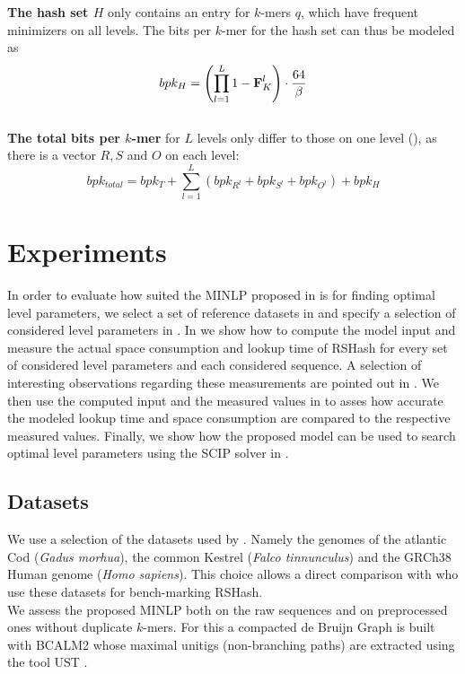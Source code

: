 \documentclass[a4paper,titlepage,onecolumn,oneside,12pt,nenglish,titlepage=firstiscover]{scrbook}
\theoremstyle{plain} %
\theoremstyle{definition} %
\theoremstyle{remark} %
\theoremstyle{plain}
\newcommand{\level}{l}
\newcommand{\kmer}{q}
\begin{document}
\textbf{The hash set $H$} only contains an entry for $k$-mers $\kmer$, which have frequent minimizers on all levels.
The bits per $k$-mer for the hash set can thus be modeled as 
\[ bpk_H = \left(\prod_{l=1}^{L} 1-\varCDF{K}^\level\right) \cdot \frac{64}{\beta}\]\\

\textbf{The total bits per $k$-mer} for $L$ levels only differ to those on one level (), as there is a vector $R,S$ and $O$ on each level:
\[ bpk_{total} = bpk_T + \sum_{l=1}^{L} \left(bpk_{R^\level} + bpk_{S^\level} + bpk_{O^\level}\right) + bpk_H\]

\chapter{Experiments}\label{chap:experiments}
In order to evaluate how suited the MINLP proposed in  is for finding optimal level parameters, we select a set of reference datasets in  and specify a selection of considered level parameters in . In  we show how to compute the model input and measure the actual space consumption and lookup time of RSHash for every set of considered level parameters and each considered sequence. A selection of interesting observations regarding these measurements are pointed out in . We then use the computed input and the measured values in  to asses how accurate the modeled lookup time and space consumption are compared to the respective measured values. Finally, we show how the proposed model can be used to search optimal level parameters using the SCIP solver \cite{AchterbergBertholdKochetal.2008, Achterberg2009, BestuzhevaChmielaMuellerSerranoVigerskeWegscheider2023} in .

\section{Datasets} \label{sec:datasets}
We use a selection of the datasets used by \citet{pibiri_sparse_2022}. Namely the genomes of the atlantic Cod (\textit{Gadus morhua}), the common Kestrel (\textit{Falco tinnunculus}) and the GRCh38 Human genome (\textit{Homo sapiens}). This choice allows a direct comparison with \citet{schulte-mattler_rshash_2026} who use these datasets for bench-marking RSHash.\\
We assess the proposed MINLP both on the raw sequences and on preprocessed ones without duplicate $k$-mers. For this a compacted de Bruijn Graph is built with BCALM2 \cite{chikhi_compacting_2016} whose maximal unitigs (non-branching paths) are extracted using the tool UST \cite{doi:10.1089/cmb.2020.0431}.\\
\end{document}

